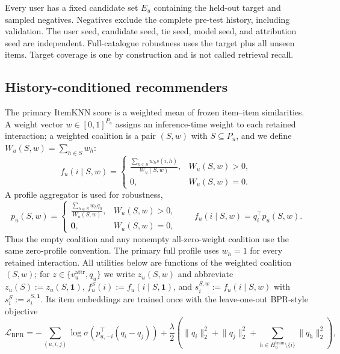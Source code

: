 \documentclass[pdflatex,sn-mathphys-num]{sn-jnl}
\theoremstyle{thmstyleone}
\theoremstyle{thmstyletwo}
\theoremstyle{thmstylethree}
\begin{document}
Every user has a fixed candidate set $E_u$ containing the held-out target and sampled negatives. Negatives exclude the complete pre-test history, including validation. The user seed, candidate seed, tie seed, model seed, and attribution seed are independent. Full-catalogue robustness uses the target plus all unseen items. Target coverage is one by construction and is not called retrieval recall.

\subsection{History-conditioned recommenders}
The primary ItemKNN score is a weighted mean of frozen item--item similarities. A weight vector $w\in[0,1]^{P_u}$ assigns an inference-time weight to each retained interaction; a weighted coalition is a pair $(S,w)$ with $S\subseteq P_u$, and we define $W_u(S,w)=\sum_{h\in S}w_h$:
\begin{equation}
f_u(i\mid S,w)=
\begin{cases}
\displaystyle\frac{\sum_{h\in S}w_hs(i,h)}{W_u(S,w)},&W_u(S,w)>0,\\[6pt]
0,&W_u(S,w)=0.
\end{cases}
\label{eq:itemknn-weighted}
\end{equation}
A profile aggregator is used for robustness,
\begin{equation}
p_u(S,w)=
\begin{cases}
\displaystyle\frac{\sum_{h\in S}w_hq_h}{W_u(S,w)},&W_u(S,w)>0,\\[6pt]
\mathbf 0,&W_u(S,w)=0,
\end{cases}
\qquad f_u(i\mid S,w)=q_i^\top p_u(S,w).
\label{eq:profile-weighted}
\end{equation}
Thus the empty coalition and any nonempty all-zero-weight coalition use the same zero-profile convention. The primary full profile uses $w_h=1$ for every retained interaction. All utilities below are functions of the weighted coalition $(S,w)$; for $z\in\{v_u^{\mathrm{attr}},q_u\}$ we write $z_u(S,w)$ and abbreviate $z_u(S):=z_u(S,\mathbf{1})$, $f_u^S(i):=f_u(i\mid S,\mathbf{1})$, and $s_i^{S,w}:=f_u(i\mid S,w)$ with $s_i^S:=s_i^{S,\mathbf{1}}$.
Its item embeddings are trained once with the leave-one-out BPR-style objective
\begin{equation}
\mathcal{L}_{\mathrm{BPR}}=-\sum_{(u,i,j)}\log\sigma\left(p_{u,-i}^{\top}(q_i-q_j)\right)
+\frac{\lambda}{2}\left(\lVert q_i\rVert_2^2+\lVert q_j\rVert_2^2+\sum_{h\in H_u^{\mathrm{train}}\setminus\{i\}}\lVert q_h\rVert_2^2\right),
\label{eq:bpr}
\end{equation}
\end{document}
